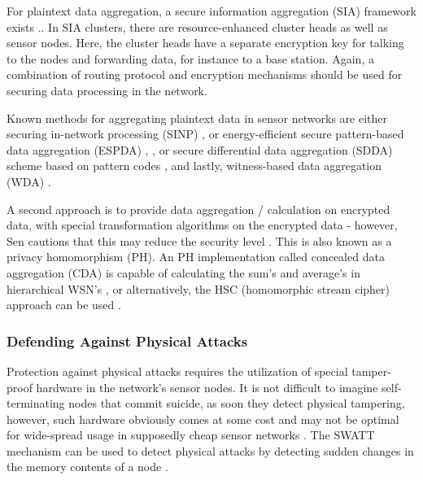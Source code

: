 \documentclass[12pt,a4paper,twoside]{report}
\begin{document}
For plaintext data aggregation, a secure information aggregation (SIA) framework exists \cite{sen:2009}.. In SIA clusters, there are resource-enhanced cluster heads as well as sensor nodes. Here, the cluster heads have a separate encryption key for talking to the nodes and forwarding data, for instance to a base station. Again, a combination of routing protocol and encryption mechanisms should be used for securing data processing in the network.\par
Known methods for aggregating plaintext data in sensor networks are either securing in-network processing (SINP) \cite{deng;etal:2003} , or energy-efficient secure pattern-based data aggregation (ESPDA) \cite{cam;etal:2003}, \cite{cam;etal:2005}, or secure differential data aggregation (SDDA) scheme based on pattern codes \cite{cam;etal:2004} , and lastly, witness-based data aggregation (WDA) \cite{du;etal:2003}.\par
A second approach is to provide data aggregation / calculation on encrypted data, with special transformation algorithms on the encrypted data - however, Sen cautions that this may reduce the security level \cite{sen:2009}. This is also known as a privacy homomorphism (PH). An PH implementation called concealed data aggregation (CDA) is capable of calculating the sum's and average's in hierarchical WSN's \cite{girao;etal:2005}, or alternatively, the HSC (homomorphic stream cipher) approach can be used \cite{castelluccia;etal:2005} .\par
\subsubsection{Defending Against Physical Attacks}
Protection against physical attacks requires the utilization of special tamper-proof hardware in the network's sensor nodes. It is not difficult to imagine self-terminating nodes that commit suicide, as soon they detect physical tampering, however, such hardware obviously comes at some cost and may not be optimal for wide-spread usage in supposedly cheap sensor networks \cite{sen:2009}. The SWATT mechanism can be used to detect physical attacks by detecting sudden changes in the memory contents of a node \cite{seshadri;etal:2004}.\par
\end{document}
